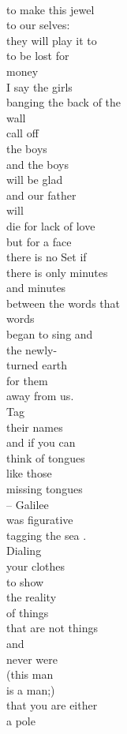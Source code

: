 \documentclass[smalldemyvopaper,11pt,twoside,onecolumn,openright,extrafontsizes]{memoir}
\begin{document}
\\to make this jewel
\\to our selves:
\\they will play it to
\\to be lost for
\\money
\\I say the girls
\\banging the back of the
\\wall
\\call off
\\the boys
\\and the boys
\\will be glad
\\and our father
\\will
\\die for lack of love
\\but for a face
\\there is no Set if
\\there is only minutes
\\and minutes
\\between the words that
\\words
\\began to sing and
\\the newly-
\\turned earth
\\for them
\\away from us.
\\Tag
\\their names
\\and if you can
\\think of tongues
\\like those
\\missing tongues
\\-- Galilee
\\was figurative
\\tagging the sea        .
\\Dialing
\\your clothes
\\to show
\\the reality
\\of things
\\that are not things
\\and
\\never were
\\(this man
\\is a man;)
\\that you are either
\\a pole
\end{document}

